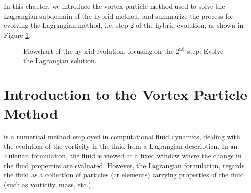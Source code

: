 

In this chapter, we introduce the vortex particle method used to solve the Lagrangian subdomain of the hybrid method, and summarize the process for evolving the Lagrangian method, i.e. step 2 of the hybrid evolution, as shown in Figure \ref{fig:flowchart_simpleCoupling_Lagrangian}.


	\begin{figure}[!h]
		\centering
		\caption{Flowchart of the hybrid evolution, focusing on the $2^{\mathrm{nd}}$ step: Evolve the Lagrangian solution.}
		\label{fig:flowchart_simpleCoupling_Lagrangian}
	\end{figure}


\section{Introduction to the Vortex Particle Method}
\label{sec:introtovpm}
 is a numerical method employed in computational fluid dynamics, dealing with the evolution of the vorticity in the fluid from a Lagrangian description. In an Eulerian formulation, the fluid is viewed at a fixed window where the change in the fluid properties are evaluated. However, the Lagrangian formulation, regards the fluid as a collection of particles (or elements) carrying properties of the fluid (such as vorticity, mass, etc.). 

